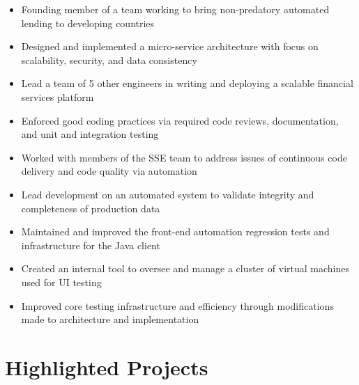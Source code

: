 \documentclass[11pt,letterpaper,sans]{moderncv}        %
\begin{document}
\begin{itemize}
\item Founding member of a team working to bring non-predatory automated lending to developing countries
\item Designed and implemented a micro-service architecture with focus on scalability, security, and data consistency
\item Lead a team of 5 other engineers in writing and deploying a scalable financial services platform
\item Enforced good coding practices via required code reviews, documentation, and unit and integration testing
\end{itemize}

\begin{itemize}
\item Worked with members of the SSE team to address issues of continuous code delivery and code quality via automation
\item Lead development on an automated system to validate integrity and completeness of production data
\item Maintained and improved the front-end automation regression tests and infrastructure for the Java client
\end{itemize}

\begin{itemize}
\item Created an internal tool to oversee and manage a cluster of virtual machines used for UI testing
\item Improved core testing infrastructure and efficiency through modifications made to architecture and implementation
\end{itemize}

\newpage

\section{Highlighted Projects}
\end{document}
